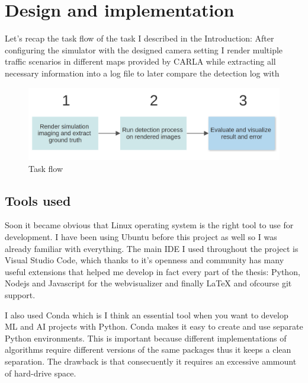 \chapter{Design and implementation}
\label{chap:designimplementation}

Let's recap the task flow of the task I described in the Introduction: After
configuring the simulator with the designed camera setting I render multiple
traffic scenarios in different maps provided by CARLA while extracting all
necessary information into a log file to later compare the detection log with


\begin{figure}[!ht]
    \centering
    \includegraphics[width=150mm, keepaspectratio]{figures/flowchart.png}
    \caption{Task flow}
    \label{fig:flow2}
\end{figure}


\section{Tools used}

Soon it became obvious that Linux operating system is the right tool to use
for development. I have been using Ubuntu before this project as well so I was
already familiar with everything. The main IDE I used throughout the project is
Visual Studio Code, which thanks to it's openness and community has many useful
extensions that helped me develop in fact every part of the thesis: Python,
Nodejs and Javascript for the webvisualizer and finally LaTeX and ofcourse git
support.

I also used Conda which is I think an essential tool when you want to develop ML
and AI projects with Python. Conda makes it easy to create and use separate
Python environments. This is important because different implementations of
algorithms require different versions of the same packages thus it keeps a clean
separation. The drawback is that consecuently it requires an excessive ammount
of hard-drive space.

